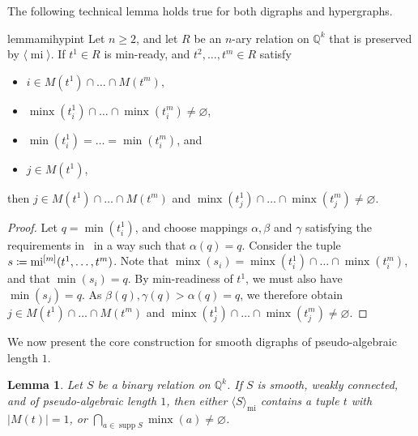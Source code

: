 \documentclass[a4paper,reqno, cleveref]{amsart}
\newcommand{\coloneqq}{\mathrel{\mathop:}\mathrel{\mkern-1.2mu}=}
\newtheorem{lemma}[theorem]{Lemma}
\newcommand{\Q}{\mathbb{Q}}
\DeclareMathOperator{\supp}{supp}
\DeclareMathOperator{\mi}{mi}
\DeclareMathOperator{\minx}{minx}
\newcommand{\nested}[2]{{#1^{[#2]}}}
\newcommand{\gen}[1]{\langle#1\rangle}
\newcommand{\genrel}[2]{\langle{#1}\rangle_{#2}}
\begin{document}
The following technical lemma holds true for both digraphs and hypergraphs. 

\begin{restatable}{lemma}{mihypint}
    \label{l:mihypint}
Let $n \geq 2$, and let $R$ be an $n$-ary relation on $\Q^k$ that is preserved by $\gen\mi$. If $t^1 \in R$ is  min-ready, and $t^2, \dots, t^{m} \in R$ satisfy \begin{itemize}
    \item $i \in M(t^1) \cap \dots \cap M(t^{m}),$
    \item $\minx(t^1_i) \cap \dots \cap \minx( t^{m}_i )\neq \varnothing  $,
    \item $\min(t_i^1)=\dots=\min(t_i^m)$, and
    \item $j\in M(t^1)$,
\end{itemize}   then  $j \in M(t^1)\cap\dots\cap M(t^m)$ and $\minx(t^1_j) \cap \dots \cap \minx(t^{m}_j) \neq \varnothing.$
\end{restatable}
\begin{proof}
    Let $q=\min(t_i^1)$, and choose mappings $\alpha, \beta$ and $\gamma$ satisfying the requirements in~ in a way such that $\alpha(q)=q$.
    Consider the tuple $s\coloneqq\nested{\mi}{m}(t^1, \dots, t^m)$.
    Note that $\minx(s_i)=\minx(t_i^1)\cap\dots\cap\minx(t_i^m)$, and that $\min(s_i)=q$.
    By min-readiness of $t^1$, we must also have $\min(s_j)=q$. 
    As $\beta(q),\gamma(q)>\alpha(q)=q$, we therefore obtain $j \in M(t^1)\cap\dots\cap M(t^m)$ and  $\minx(t_j^1)\cap \dots \cap\minx(t_j^m)\neq \varnothing $.
\end{proof}

We now present the core construction for smooth digraphs of pseudo-algebraic length $1$.
\begin{lemma}\label{lemma:mi:minx_int2}
Let $S$ be a binary relation on $\Q^k$. If $S$ is smooth, weakly connected, and of pseudo-algebraic length $1$, then either $\genrel{S}{\mi}$ contains a tuple $t$ with $|M(t)|=1$, or $\bigcap_{a\in \supp{S}}\minx(a)\neq\varnothing$. 
\end{lemma}
\end{document}
